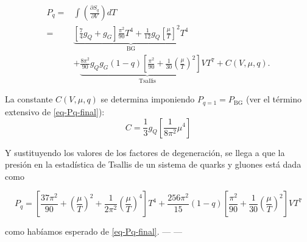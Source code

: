 \begin{equation}\label{eq-Tsallis-Pressure}
\begin{split}
{P}_{q} = & \int \left(\frac{\partial{S}_q}{\partial V}\right) dT \nonumber \\
= & \underbrace{\left[\frac{7}{4} {g}_{Q} + {g}_{G} \right] \frac{{\pi}^{2}}{90} {T}^{4} + \frac{1}{12}{g}_{Q} \left[\frac{\mu}{T}\right]^{2}{T}^{4}}_{\text{BG}}\\
& + \underbrace{\frac{8{\pi}^{2}}{90} {g}_{Q}{g}_{G}(1-q) \left[\frac{{\pi}^{2}}{90} + \frac{1}{30} \left( \frac{\mu}{T}\right)^{2}\right]V{T}^{7}}_{\text{Tsallis}} + C(V,\mu,q).
\end{split}
\end{equation}

La constante $C(V,\mu,q)$ se determina imponiendo ${P}_{q=1} = {P}_{\text{BG}}$ (ver el término extensivo de \eqref{eq-Pq-final}):
\begin{equation}
C = \frac{1}{3}{g}_Q \left[\frac{1}{8\pi^2}\mu^4\right]
\end{equation}

Y sustituyendo los valores de los factores de degeneración, se llega a que la presión en la estadística de Tsallis de un sistema de quarks y gluones está dada como

\begin{equation}
{P}_{q} = \left[\frac{37{\pi}^{2}}{90} + \left(\frac{\mu}{T} \right)^{2} + \frac{1}{2{\pi}^{2}} \left(\frac{\mu}{T} \right)^{4} \right]{T}^{4} + \frac{256{\pi}^{2}}{15}(1-q) \left[\frac{{\pi}^{2}}{90} + \frac{1}{30} \left(\frac{\mu}{T} \right)^{2} \right]V{T}^{7}
\end{equation}

como habíamos esperado de \eqref{eq-Pq-final}. 
---
---

